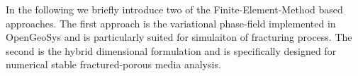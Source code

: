 In the following we briefly introduce two of the Finite-Element-Method based approaches.
The first approach is the variational phase-field implemented in OpenGeoSys and is particularly suited for simulaiton of fracturing process.
The second is the hybrid dimensional formulation and is specifically designed for numerical stable fractured-porous media analysis.
%


\label{subsec:fem-vpf}

%

